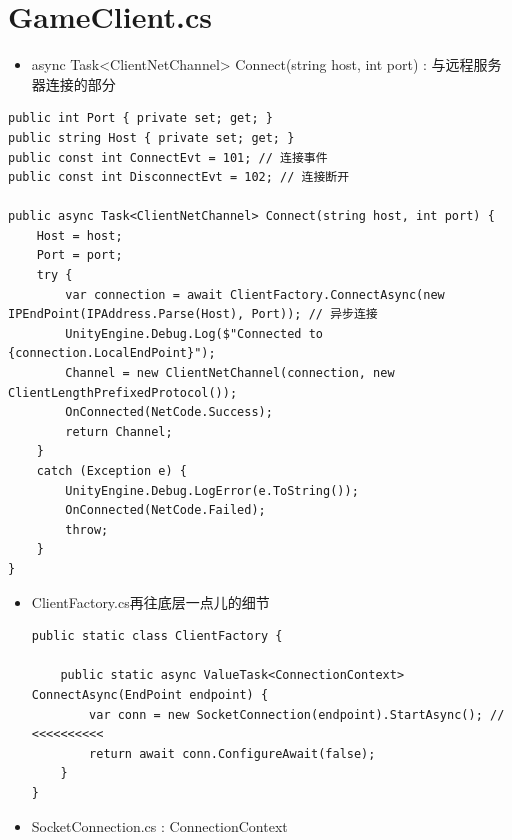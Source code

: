 \documentclass[9pt, b5paper]{article}
\begin{document}
\section{GameClient.cs}
\label{sec:org20a73a2}
\begin{itemize}
\item async Task<ClientNetChannel> Connect(string host, int port) : 与远程服务器连接的部分
\end{itemize}
\begin{verbatim}
public int Port { private set; get; }
public string Host { private set; get; }
public const int ConnectEvt = 101; // 连接事件
public const int DisconnectEvt = 102; // 连接断开

public async Task<ClientNetChannel> Connect(string host, int port) {
    Host = host;
    Port = port;
    try {
        var connection = await ClientFactory.ConnectAsync(new IPEndPoint(IPAddress.Parse(Host), Port)); // 异步连接
        UnityEngine.Debug.Log($"Connected to {connection.LocalEndPoint}");
        Channel = new ClientNetChannel(connection, new ClientLengthPrefixedProtocol());
        OnConnected(NetCode.Success);
        return Channel;
    }
    catch (Exception e) {
        UnityEngine.Debug.LogError(e.ToString());
        OnConnected(NetCode.Failed);
        throw;
    }
}
\end{verbatim}
\begin{itemize}
\item ClientFactory.cs再往底层一点儿的细节
\begin{verbatim}
public static class ClientFactory {

    public static async ValueTask<ConnectionContext> ConnectAsync(EndPoint endpoint) {
        var conn = new SocketConnection(endpoint).StartAsync(); // <<<<<<<<<< 
        return await conn.ConfigureAwait(false);
    }
}
\end{verbatim}
\item SocketConnection.cs : ConnectionContext
\end{itemize}
\end{document}
